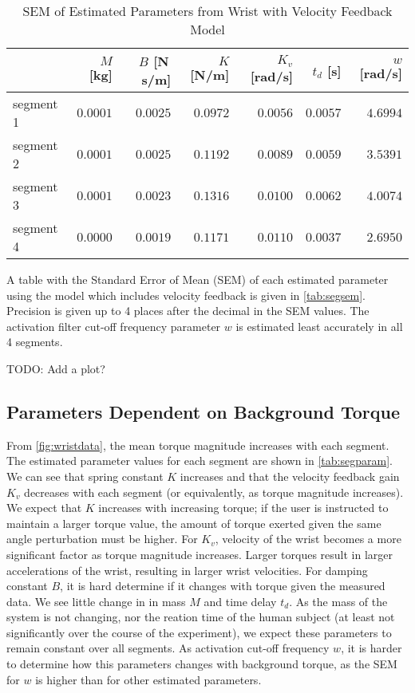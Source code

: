 \documentclass[11pt,a4paper]{article}
\begin{document}
\begin{table}
    \centering
    \begin{tabular}{|l|r|r|r|r|r|r|}
        \hline
        \nonumber & $M$ [kg] & $B$ [N\,s/m] & $K$ [N/m] & $K_v$ [rad/s] &
            $t_d$ [s] & $w$ [rad/s] \\
        \hline
        segment 1 &
            $0.0001$ & $0.0025$ & $0.0972$ & $0.0056$ & $0.0057$ & $4.6994$ \\
        segment 2 &
            $0.0001$ & $0.0025$ & $0.1192$ & $0.0089$ & $0.0059$ & $3.5391$ \\
        segment 3 &
            $0.0001$ & $0.0023$ & $0.1316$ & $0.0100$ & $0.0062$ & $4.0074$ \\
        segment 4 &
            $0.0000$ & $0.0019$ & $0.1171$ & $0.0110$ & $0.0037$ & $2.6950$ \\
        \hline
    \end{tabular}
    \caption{SEM of Estimated Parameters from Wrist with Velocity Feedback
        Model}
    \label{tab:segsem}
\end{table}

A table with the Standard Error of Mean (SEM) of each estimated parameter using
the model which includes velocity feedback is given in \autoref{tab:segsem}.
Precision is given up to 4 places after the decimal in the SEM values. The
activation filter cut-off frequency parameter $w$ is estimated least accurately
in all 4 segments.

TODO: Add a plot?

\subsection{Parameters Dependent on Background Torque}
From \autoref{fig:wristdata}, the mean torque magnitude increases with each
segment. The estimated parameter values for each segment are shown in
\autoref{tab:segparam}. We can see that spring constant $K$ increases and that
the velocity feedback gain $K_v$ decreases with each segment (or equivalently,
as torque magnitude increases). We expect that $K$ increases with increasing
torque; if the user is instructed to maintain a larger torque value, the amount
of torque exerted given the same angle perturbation must be higher. For $K_v$,
velocity of the wrist becomes a more significant factor as torque magnitude
increases. Larger torques result in larger accelerations of the wrist,
resulting in larger wrist velocities. For damping constant $B$, it is hard
determine if it changes with torque given the measured data. We see little
change in in mass $M$ and time delay $t_d$. As the mass of the system is not
changing, nor the reation time of the human subject (at least not significantly
over the course of the experiment), we expect these parameters to remain
constant over all segments. As activation cut-off frequency $w$, it is harder
to determine how this parameters changes with background torque, as the SEM for
$w$ is higher than for other estimated parameters.
\end{document}
